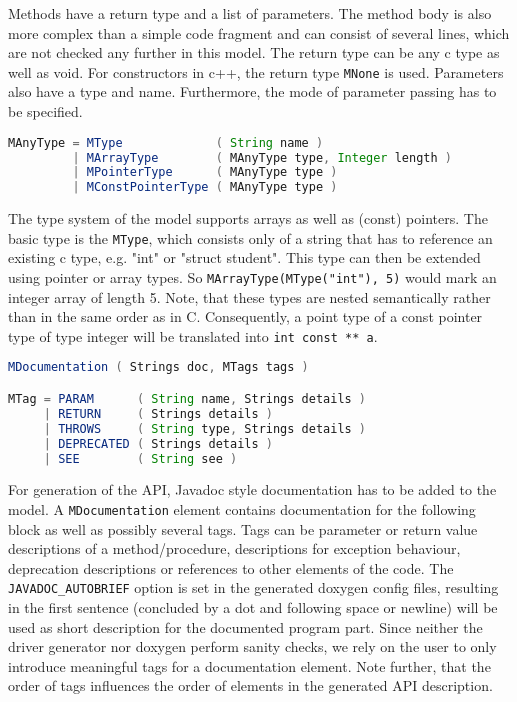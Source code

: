 \documentclass{report}
\begin{document}
Methods have a return type and a list of parameters. The method body is also more complex than a simple code fragment and can consist of several lines, which are not checked any further in this model. The return type can be any c type as well as void. For constructors in c++, the return type \texttt{MNone} is used. Parameters also have a type and name. Furthermore, the mode of parameter passing has to be specified.

\begin{lstlisting}[language=java, breaklines=true]
MAnyType = MType             ( String name )
         | MArrayType        ( MAnyType type, Integer length )
         | MPointerType      ( MAnyType type )
         | MConstPointerType ( MAnyType type )
\end{lstlisting}

The type system of the model supports arrays as well as (const) pointers. The basic type is the \texttt{MType}, which consists only of a string that has to reference an existing c type, e.g. "int" or "struct student". This type can then be extended using pointer or array types. So \texttt{MArrayType(MType("int"), 5)} would mark an integer array of length 5. Note, that these types are nested semantically rather than in the same order as in C. Consequently, a point type of a const pointer type of type integer will be translated into \texttt{int const ** a}.

\begin{lstlisting}[language=java, breaklines=true]
MDocumentation ( Strings doc, MTags tags )

MTag = PARAM      ( String name, Strings details )
     | RETURN     ( Strings details )
     | THROWS     ( String type, Strings details )
     | DEPRECATED ( Strings details ) 
     | SEE        ( String see )
\end{lstlisting}

For generation of the API, Javadoc style documentation has to be added to the model. A \texttt{MDocumentation} element contains documentation for the following block as well as possibly several tags. Tags can be parameter or return value descriptions of a method/procedure, descriptions for exception behaviour, deprecation descriptions or references to other elements of the code. The \texttt{JAVADOC\_AUTOBRIEF} option is set in the generated doxygen config files, resulting in the first sentence (concluded by a dot and following space or newline) will be used as short description for the documented program part. Since neither the driver generator nor doxygen perform sanity checks, we rely on the user to only introduce meaningful tags for a documentation element. Note further, that the order of tags influences the order of elements in the generated API description.
\end{document}
